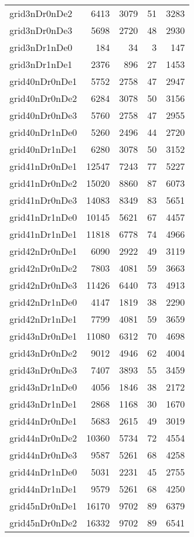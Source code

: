 \documentclass[../../../thesis.tex]{subfiles}
\begin{document}
\begin{longtable}{lrrrr}
grid3nDr0nDe2 & 6413 & 3079 & 51 & 3283 \\
grid3nDr0nDe3 & 5698 & 2720 & 48 & 2930 \\
grid3nDr1nDe0 & 184 & 34 & 3 & 147 \\
grid3nDr1nDe1 & 2376 & 896 & 27 & 1453 \\
grid40nDr0nDe1 & 5752 & 2758 & 47 & 2947 \\
grid40nDr0nDe2 & 6284 & 3078 & 50 & 3156 \\
grid40nDr0nDe3 & 5760 & 2758 & 47 & 2955 \\
grid40nDr1nDe0 & 5260 & 2496 & 44 & 2720 \\
grid40nDr1nDe1 & 6280 & 3078 & 50 & 3152 \\
grid41nDr0nDe1 & 12547 & 7243 & 77 & 5227 \\
grid41nDr0nDe2 & 15020 & 8860 & 87 & 6073 \\
grid41nDr0nDe3 & 14083 & 8349 & 83 & 5651 \\
grid41nDr1nDe0 & 10145 & 5621 & 67 & 4457 \\
grid41nDr1nDe1 & 11818 & 6778 & 74 & 4966 \\
grid42nDr0nDe1 & 6090 & 2922 & 49 & 3119 \\
grid42nDr0nDe2 & 7803 & 4081 & 59 & 3663 \\
grid42nDr0nDe3 & 11426 & 6440 & 73 & 4913 \\
grid42nDr1nDe0 & 4147 & 1819 & 38 & 2290 \\
grid42nDr1nDe1 & 7799 & 4081 & 59 & 3659 \\
grid43nDr0nDe1 & 11080 & 6312 & 70 & 4698 \\
grid43nDr0nDe2 & 9012 & 4946 & 62 & 4004 \\
grid43nDr0nDe3 & 7407 & 3893 & 55 & 3459 \\
grid43nDr1nDe0 & 4056 & 1846 & 38 & 2172 \\
grid43nDr1nDe1 & 2868 & 1168 & 30 & 1670 \\
grid44nDr0nDe1 & 5683 & 2615 & 49 & 3019 \\
grid44nDr0nDe2 & 10360 & 5734 & 72 & 4554 \\
grid44nDr0nDe3 & 9587 & 5261 & 68 & 4258 \\
grid44nDr1nDe0 & 5031 & 2231 & 45 & 2755 \\
grid44nDr1nDe1 & 9579 & 5261 & 68 & 4250 \\
grid45nDr0nDe1 & 16170 & 9702 & 89 & 6379 \\
grid45nDr0nDe2 & 16332 & 9702 & 89 & 6541 \\

\end{longtable}
\end{document}
